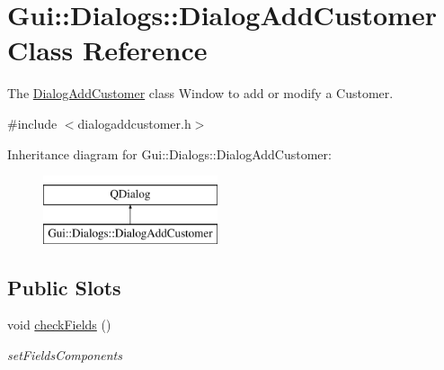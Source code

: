 \hypertarget{classGui_1_1Dialogs_1_1DialogAddCustomer}{\section{Gui\+:\+:Dialogs\+:\+:Dialog\+Add\+Customer Class Reference}
\label{classGui_1_1Dialogs_1_1DialogAddCustomer}
}


The \hyperlink{classGui_1_1Dialogs_1_1DialogAddCustomer}{Dialog\+Add\+Customer} class Window to add or modify a Customer.  




{\ttfamily \#include $<$dialogaddcustomer.\+h$>$}

Inheritance diagram for Gui\+:\+:Dialogs\+:\+:Dialog\+Add\+Customer\+:\begin{figure}[H]
\begin{center}
\leavevmode
\includegraphics[height=2.000000cm]{d2/d50/classGui_1_1Dialogs_1_1DialogAddCustomer}
\end{center}
\end{figure}
\subsection*{Public Slots}
\begin{DoxyCompactItemize}
\item 
\hypertarget{classGui_1_1Dialogs_1_1DialogAddCustomer_ab1c4fdf53139a3aac7243c42881d2af1}{void \hyperlink{classGui_1_1Dialogs_1_1DialogAddCustomer_ab1c4fdf53139a3aac7243c42881d2af1}{check\+Fields} ()}\label{classGui_1_1Dialogs_1_1DialogAddCustomer_ab1c4fdf53139a3aac7243c42881d2af1}

\begin{DoxyCompactList}\small\item\em set\+Fields\+Components \end{DoxyCompactList}\end{DoxyCompactItemize}
